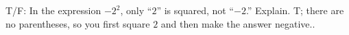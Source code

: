 {T/F: In the expression $-2^2$, only ``$2$'' is squared, not ``$-2$.'' Explain.}
{T; there are no parentheses, so you first square $2$ and then make the answer negative..}
